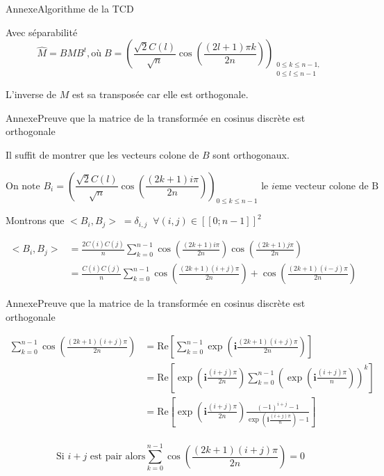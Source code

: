 \begin{frame}{Annexe}{Algorithme de la TCD}
    \begin{block}{Avec séparabilité}
        \[\widehat{M} = BMB^t, \textrm{où} \; B = {\left(\frac{\sqrt{2}C(l)}{\sqrt{n}}\cos\left(\frac{(2l+1)\pi k}{2n}\right)\right)}_{\substack{0 \leqslant k \leqslant n-1,\\ 0 \leqslant l \leqslant n-1}}\]

        \center L'inverse de \(M\) est sa transposée car elle est orthogonale.
    \end{block}
\end{frame}

\begin{frame}{Annexe}{Preuve que la matrice de la transformée en cosinus discrète est orthogonale}
    \footnotesize{
    Il suffit de montrer que les vecteurs colone de \(B\) sont orthogonaux.

    \[\textrm{On note } B_i = \left(\frac{\sqrt{2}C(l)}{\sqrt{n}}\cos\left(\frac{(2k+1)i\pi}{2n}\right)\right)_{0 \leqslant k \leqslant n - 1} \textrm{ le } i\textrm{eme vecteur colone de B}\]

    Montrons que \(<B_i, B_j> \;= \delta_{i,j} \;\; \forall (i,j) \in [\![0;n-1]\!]^2 \)
    
    \begin{align*}
        <B_i, B_j> &= \frac{2C(i)C(j)}{n}\sum_{k = 0}^{n-1}\cos\left(\frac{(2k+1)i\pi}{2n}\right)\cos\left(\frac{(2k+1)j\pi}{2n}\right)\\
        &= \frac{C(i)C(j)}{n}\sum_{k = 0}^{n-1}\cos\left(\frac{(2k+1)(i+j)\pi}{2n}\right)+\cos\left(\frac{(2k+1)(i-j)\pi}{2n}\right)
    \end{align*}

    }
\end{frame}
\begin{frame}{Annexe}{Preuve que la matrice de la transformée en cosinus discrète est orthogonale}
    \footnotesize{

    \begin{align*}
        \sum_{k = 0}^{n-1}\cos\left(\frac{(2k+1)(i+j)\pi}{2n}\right) &= \mbox{Re}\!\left[\sum_{k = 0}^{n-1}\exp\left(\mathbf{i}\frac{(2k+1)(i+j)\pi}{2n}\right)\right]\\
        &= \mbox{Re}\!\left[ \exp\left(\mathbf{i}\frac{(i+j)\pi}{2n}\right) \sum_{k = 0}^{n-1}\left(\exp\left(\mathbf{i}\frac{(i+j)\pi}{n}\right)\right)^k\right]\\
        &= \mbox{Re}\!\left[ \exp\left(\mathbf{i}\frac{(i+j)\pi}{2n}\right) \frac{(-1)^{i+j} - 1}{\exp\left(\mathbf{i}\frac{(i+j)\pi}{n}\right) - 1}\right]\\
    \end{align*}

    \[\textrm{Si } i+j \textrm{ est pair alors}  \sum_{k = 0}^{n-1}\cos\left(\frac{(2k+1)(i+j)\pi}{2n}\right) = 0\]
   
    }
\end{frame}
